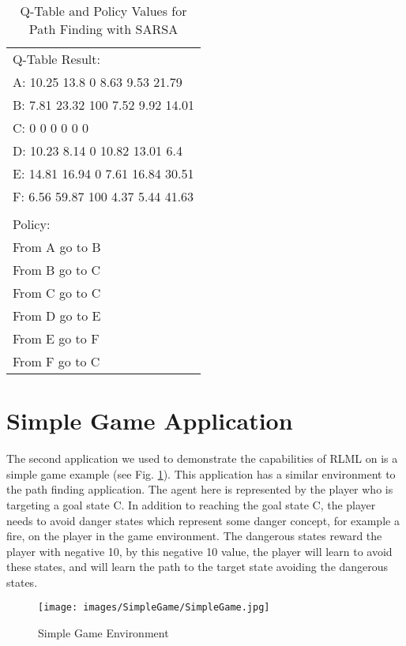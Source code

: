 \documentclass[11pt,letterpaper]{ryersonSGSThesis}
\begin{document}
\begin{ryersonSGSThesis}
    \begin{table}[h!]
    \centering
    \begin{tabular}{|l|} 
        \hline
        Q-Table Result: \\
        A:  10.25 13.8 0 8.63 9.53 21.79 \\
        B:  7.81 23.32 100 7.52 9.92 14.01 \\
        C:  0 0 0 0 0 0 \\
        D:  10.23 8.14 0 10.82 13.01 6.4 \\
        E:  14.81 16.94 0 7.61 16.84 30.51 \\
        F:  6.56 59.87 100 4.37 5.44 41.63 \\
        \\
        Policy: \\
        From A go to B \\
        From B go to C \\
        From C go to C \\
        From D go to E \\
        From E go to F \\
        From F go to C\\ [1ex]
        \hline
    \end{tabular}
    \caption{Q-Table and Policy Values for Path Finding with SARSA} \label{table:PathFindingSARSAQTablePolicy}
    \end{table}
    
    \section{Simple Game Application}
    
    The second application we used to demonstrate the capabilities of RLML on is a simple game example \cite{simpleGame} (see Fig. \ref{fig:SimpleGame}). This application has a similar environment to the path finding application. The agent here is represented by the player who is targeting a goal state C. In addition to reaching the goal state C, the player needs to avoid danger states which represent some danger concept, for example a fire, on the player in the game environment. The dangerous states reward the player with negative 10, by this negative 10 value, the player will learn to avoid these states, and will learn the path to the target state avoiding the dangerous states.
    
    \begin{figure}[!tbh]
        \centering
        \texttt{[image: images/SimpleGame/SimpleGame.jpg]}
        \caption{Simple Game Environment}
        \label{fig:SimpleGame}
    \end{figure}
    

\end{ryersonSGSThesis}
\end{document}
